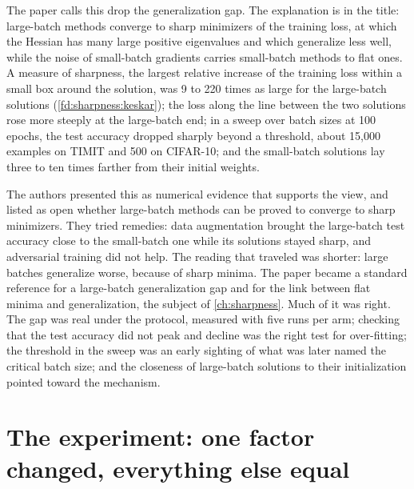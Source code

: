 \begin{refsection}
The paper calls this drop the generalization gap. 
The explanation is in the title: large-batch methods converge to sharp minimizers of the training loss, at which the Hessian has many large positive eigenvalues and which generalize less well, while the noise of small-batch gradients carries small-batch methods to flat ones. A measure of sharpness, the largest relative increase of the training loss within a small box around the solution, was 9 to 220 times as large for the large-batch solutions (\cref{fd:sharpness:keskar}); the loss along the line between the two solutions rose more steeply at the large-batch end; in a sweep over batch sizes at 100 epochs, the test accuracy dropped sharply beyond a threshold, about 15,000 examples on TIMIT and 500 on CIFAR-10; and the small-batch solutions lay three to ten times farther from their initial weights.

The authors presented this as numerical evidence that supports the view, and listed as open whether large-batch methods can be proved to converge to sharp minimizers. They tried remedies: data augmentation brought the large-batch test accuracy close to the small-batch one while its solutions stayed sharp, and adversarial training did not help. The reading that traveled was shorter: large batches generalize worse, because of sharp minima. The paper became a standard reference for a large-batch generalization gap and for the link between flat minima and generalization, the subject of \cref{ch:sharpness}. Much of it was right. The gap was real under the protocol, measured with five runs per arm; checking that the test accuracy did not peak and decline was the right test for over-fitting; the threshold in the sweep was an early sighting of what was later named the critical batch size; and the closeness of large-batch solutions to their initialization pointed toward the mechanism.

\section{The experiment: one factor changed, everything else equal}\label{sec:heldfixed:experiment}


\end{refsection}

